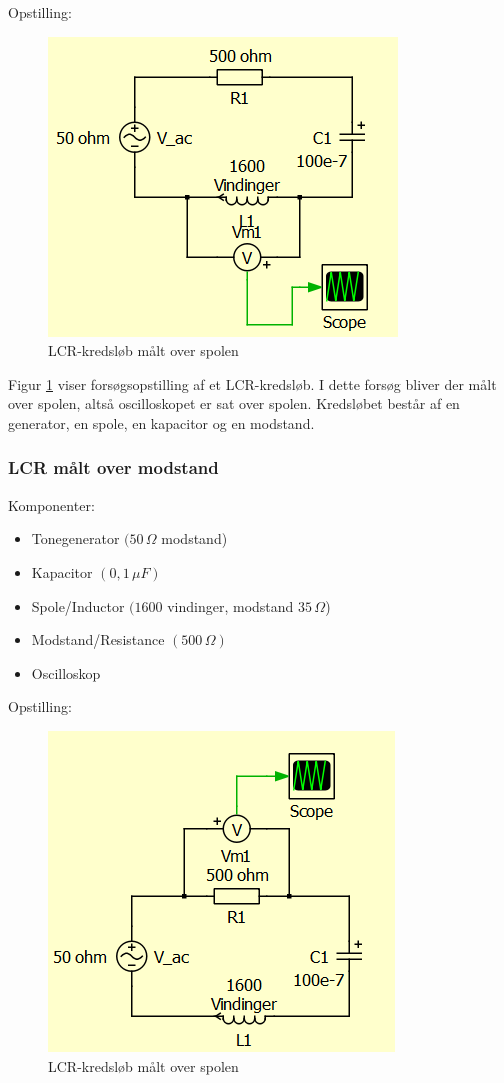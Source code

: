 Opstilling:

\begin{figure}[H]
\centering
\includegraphics[scale=1]{Vildledning/Schematics/Kredslb/LCR_spole}
\caption{LCR-kredsløb målt over spolen}
\label{figure:lcrspole}
\end{figure}

Figur \ref{figure:lcrspole} viser forsøgsopstilling af et LCR-kredsløb. I dette forsøg bliver der målt over spolen, altså oscilloskopet er sat over spolen. Kredsløbet består af en generator, en spole, en kapacitor og en modstand.

\subsubsection{LCR målt over modstand}

Komponenter:

\begin{itemize}
\item Tonegenerator $(50\, \Omega$ modstand)
\item Kapacitor $( 0,1\, \mu F)$
\item Spole/Inductor $(1600$ vindinger, modstand $35 \, \Omega$)
\item Modstand/Resistance $(500\, \Omega)$
\item Oscilloskop
\end{itemize}


Opstilling:

\begin{figure}[H]
\centering
\includegraphics[scale=1]{Vildledning/Schematics/Kredslb/LCR_modstand}
\caption{LCR-kredsløb målt over spolen}
\label{lcrmodstand}
\end{figure}

